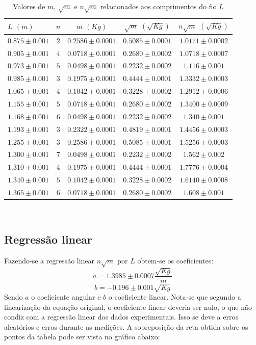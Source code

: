 \documentclass[12pt,a4paper]{article}
\begin{document}
\begin{table}[!htbp]
\centering
\def\arraystretch{1.3}
\caption{Valores de $m$, $\sqrt{m}$ e $n\sqrt{m}$ relacionados aos comprimentos do fio $L$}
\label{Resultados}
\begin{tabular}{|l|c|c|c|c|}
\hline
$L$ $(m)$ & $n$ & $m$ $(Kg)$ & $\sqrt{m}$ $(\sqrt{Kg})$ & $n\sqrt{m}$ $(\sqrt{Kg})$ \\
\hline
$0.875\pm0.001$ & $2$ & $0.2586\pm0.0001$ & $0.5085\pm0.0001$ & $1.0171\pm0.0002$ \\
\hline
$0.905\pm0.001$ & $4$ & $0.0718\pm0.0001$ & $0.2680\pm0.0002$ & $1.0718\pm0.0007$ \\
\hline
$0.973\pm0.001$ & $5$ & $0.0498\pm0.0001$ & $0.2232\pm0.0002$ & $1.116\pm0.001$ \\
\hline
$0.985\pm0.001$ & $3$ & $0.1975\pm0.0001$ & $0.4444\pm0.0001$ & $1.3332\pm0.0003$ \\
\hline
$1.065\pm0.001$ & $4$ & $0.1042\pm0.0001$ & $0.3228\pm0.0002$ & $1.2912\pm0.0006$ \\
\hline
$1.155\pm0.001$ & $5$ & $0.0718\pm0.0001$ & $0.2680\pm0.0002$ & $1.3400\pm0.0009$ \\
\hline
$1.168\pm0.001$ & $6$ & $0.0498\pm0.0001$ & $0.2232\pm0.0002$ & $1.340\pm0.001$ \\
\hline
$1.193\pm0.001$ & $3$ & $0.2322\pm0.0001$ & $0.4819\pm0.0001$ & $1.4456\pm0.0003$ \\
\hline
$1.255\pm0.001$ & $3$ & $0.2586\pm0.0001$ & $0.5085\pm0.0001$ & $1.5256\pm0.0003$ \\
\hline
$1.300\pm0.001$ & $7$ & $0.0498\pm0.0001$ & $0.2232\pm0.0002$ & $1.562\pm0.002$ \\
\hline
$1.310\pm0.001$ & $4$ & $0.1975\pm0.0001$ & $0.4444\pm0.0001$ & $1.7776\pm0.0004$ \\
\hline
$1.340\pm0.001$ & $5$ & $0.1042\pm0.0001$ & $0.3228\pm0.0002$ & $1.6140\pm0.0008$ \\
\hline
$1.365\pm0.001$ & $6$ & $0.0718\pm0.0001$ & $0.2680\pm0.0002$ & $1.608\pm0.001$ \\
\hline

\end{tabular} \\

\end{table}

\subsection{Regressão linear}
Fazendo-se a regressão linear $n\sqrt{m}$ por $L$ obtem-se os coeficientes:
$$a = 1.3985 \pm 0.0007 \dfrac{\sqrt{Kg}}{m}$$
$$b = -0.196 \pm 0.001 \sqrt{Kg}$$
Sendo $a$ o coeficiente angular e $b$ o coeficiente linear.
Nota-se que segundo a linearização da equação original, o coeficiente linear deveria ser nulo, o que não condiz com a regressão linear dos dados experimentais. Isso se deve a erros aleatórios e erros durante as medições.
A sobreposição da reta obtida sobre os pontos da tabela pode ser vista no gráfico abaixo:
\end{document}
